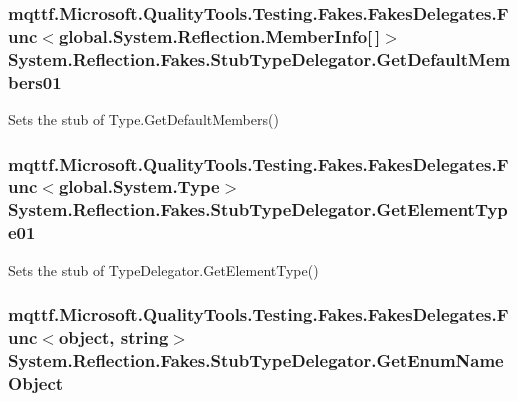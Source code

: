 \hypertarget{class_system_1_1_reflection_1_1_fakes_1_1_stub_type_delegator_a3eeee3f86f2a2f47dc66dd3b834d2910}{
\subsubsection[{Get\-Default\-Members01}]{\setlength{\rightskip}{0pt plus 5cm}mqttf.\-Microsoft.\-Quality\-Tools.\-Testing.\-Fakes.\-Fakes\-Delegates.\-Func$<$global.\-System.\-Reflection.\-Member\-Info\mbox{[}$\,$\mbox{]}$>$ System.\-Reflection.\-Fakes.\-Stub\-Type\-Delegator.\-Get\-Default\-Members01}}\label{class_system_1_1_reflection_1_1_fakes_1_1_stub_type_delegator_a3eeee3f86f2a2f47dc66dd3b834d2910}


Sets the stub of Type.\-Get\-Default\-Members()

\hypertarget{class_system_1_1_reflection_1_1_fakes_1_1_stub_type_delegator_a2ef1cd32d0d61ba0270c5e17d1220815}{
\subsubsection[{Get\-Element\-Type01}]{\setlength{\rightskip}{0pt plus 5cm}mqttf.\-Microsoft.\-Quality\-Tools.\-Testing.\-Fakes.\-Fakes\-Delegates.\-Func$<$global.\-System.\-Type$>$ System.\-Reflection.\-Fakes.\-Stub\-Type\-Delegator.\-Get\-Element\-Type01}}\label{class_system_1_1_reflection_1_1_fakes_1_1_stub_type_delegator_a2ef1cd32d0d61ba0270c5e17d1220815}


Sets the stub of Type\-Delegator.\-Get\-Element\-Type()

\hypertarget{class_system_1_1_reflection_1_1_fakes_1_1_stub_type_delegator_a49d9d01c03cd10b1c560777e41570011}{
\subsubsection[{Get\-Enum\-Name\-Object}]{\setlength{\rightskip}{0pt plus 5cm}mqttf.\-Microsoft.\-Quality\-Tools.\-Testing.\-Fakes.\-Fakes\-Delegates.\-Func$<$object, string$>$ System.\-Reflection.\-Fakes.\-Stub\-Type\-Delegator.\-Get\-Enum\-Name\-Object}}\label{class_system_1_1_reflection_1_1_fakes_1_1_stub_type_delegator_a49d9d01c03cd10b1c560777e41570011}



